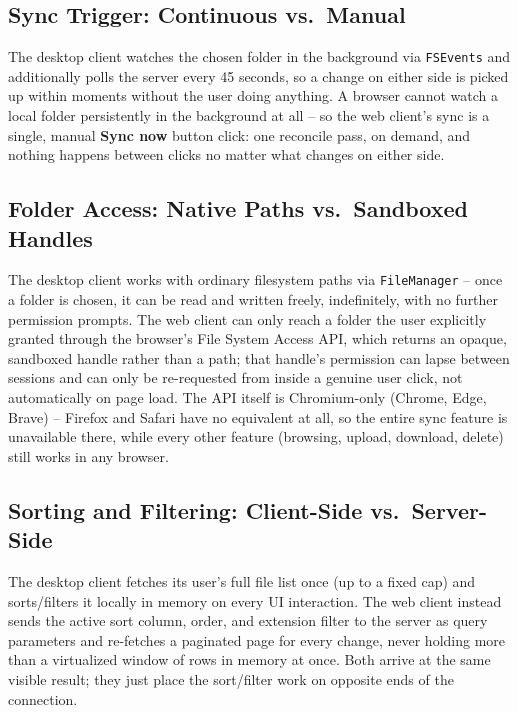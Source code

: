 \documentclass[12pt,a4paper]{article}
\begin{document}
\subsection{Sync Trigger: Continuous vs.\ Manual}

The desktop client watches the chosen folder in the background via \texttt{FSEvents} and additionally polls the server every 45 seconds, so a change on either side is picked up within moments without the user doing anything. A browser cannot watch a local folder persistently in the background at all -- so the web client's sync is a single, manual \textbf{Sync now} button click: one reconcile pass, on demand, and nothing happens between clicks no matter what changes on either side.

\subsection{Folder Access: Native Paths vs.\ Sandboxed Handles}

The desktop client works with ordinary filesystem paths via \texttt{FileManager} -- once a folder is chosen, it can be read and written freely, indefinitely, with no further permission prompts. The web client can only reach a folder the user explicitly granted through the browser's File System Access API, which returns an opaque, sandboxed handle rather than a path; that handle's permission can lapse between sessions and can only be re-requested from inside a genuine user click, not automatically on page load. The API itself is Chromium-only (Chrome, Edge, Brave) -- Firefox and Safari have no equivalent at all, so the entire sync feature is unavailable there, while every other feature (browsing, upload, download, delete) still works in any browser.

\subsection{Sorting and Filtering: Client-Side vs.\ Server-Side}

The desktop client fetches its user's full file list once (up to a fixed cap) and sorts/filters it locally in memory on every UI interaction. The web client instead sends the active sort column, order, and extension filter to the server as query parameters and re-fetches a paginated page for every change, never holding more than a virtualized window of rows in memory at once. Both arrive at the same visible result; they just place the sort/filter work on opposite ends of the connection.
\end{document}
